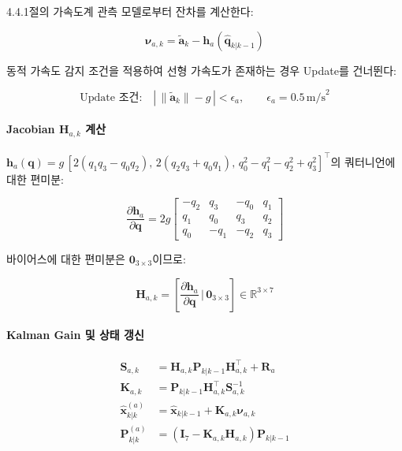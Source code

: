 4.4.1절의 가속도계 관측 모델로부터 잔차를 계산한다:

\begin{equation}
    \boldsymbol{\nu}_{a,k} = \tilde{\mathbf{a}}_k - \mathbf{h}_a(\hat{\mathbf{q}}_{k|k-1})
    \label{eq:ekf_accel_innovation}
\end{equation}

동적 가속도 감지 조건을 적용하여 선형 가속도가 존재하는 경우 Update를 건너뛴다:

\begin{equation}
    \text{Update 조건:} \quad \left|\,\|\tilde{\mathbf{a}}_k\| - g\,\right| < \epsilon_a, \qquad \epsilon_a = 0.5\,\text{m/s}^2
    \label{eq:ekf_accel_condition}
\end{equation}

\paragraph{Jacobian $\mathbf{H}_{a,k}$ 계산}

$\mathbf{h}_a(\mathbf{q}) = g\,[2(q_1 q_3 - q_0 q_2),\, 2(q_2 q_3 + q_0 q_1),\, q_0^2 - q_1^2 - q_2^2 + q_3^2]^\top$의
쿼터니언에 대한 편미분:

\begin{equation}
    \frac{\partial \mathbf{h}_a}{\partial \mathbf{q}} = 2g\begin{bmatrix}
        -q_2 &  q_3 & -q_0 &  q_1 \\
         q_1 &  q_0 &  q_3 &  q_2 \\
         q_0 & -q_1 & -q_2 &  q_3
    \end{bmatrix}
    \label{eq:ekf_Ha_quat}
\end{equation}

바이어스에 대한 편미분은 $\mathbf{0}_{3\times 3}$이므로:

\begin{equation}
    \mathbf{H}_{a,k} = \left[\frac{\partial \mathbf{h}_a}{\partial \mathbf{q}}\,\Bigg|\, \mathbf{0}_{3\times 3}\right] \in \mathbb{R}^{3\times 7}
    \label{eq:ekf_Ha}
\end{equation}

\paragraph{Kalman Gain 및 상태 갱신}

\begin{align}
    \mathbf{S}_{a,k} &= \mathbf{H}_{a,k}\mathbf{P}_{k|k-1}\mathbf{H}_{a,k}^\top + \mathbf{R}_a \label{eq:ekf_Sa} \\
    \mathbf{K}_{a,k} &= \mathbf{P}_{k|k-1}\mathbf{H}_{a,k}^\top \mathbf{S}_{a,k}^{-1} \label{eq:ekf_Ka} \\
    \hat{\mathbf{x}}_{k|k}^{(a)} &= \hat{\mathbf{x}}_{k|k-1} + \mathbf{K}_{a,k}\boldsymbol{\nu}_{a,k} \label{eq:ekf_state_update_a} \\
    \mathbf{P}_{k|k}^{(a)} &= \left(\mathbf{I}_7 - \mathbf{K}_{a,k}\mathbf{H}_{a,k}\right)\mathbf{P}_{k|k-1} \label{eq:ekf_cov_update_a}
\end{align}

